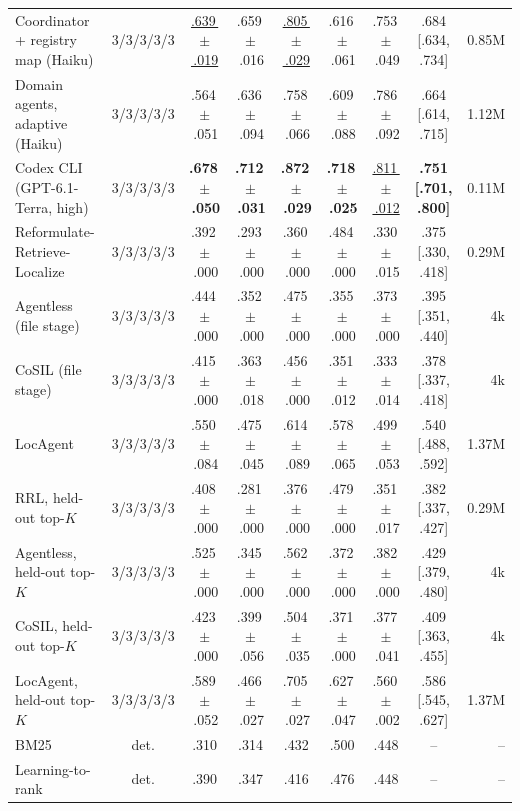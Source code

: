 \begin{table}[t]
{\begin{tabular}{lcccccccr}
Coordinator + registry map (Haiku) & 3/3/3/3/3 & \underline{.639\,$\pm$\,.019} & .659\,$\pm$\,.016 & \underline{.805\,$\pm$\,.029} & .616\,$\pm$\,.061 & .753\,$\pm$\,.049 & .684 [.634, .734] & 0.85M \\
Domain agents, adaptive (Haiku) & 3/3/3/3/3 & .564\,$\pm$\,.051 & .636\,$\pm$\,.094 & .758\,$\pm$\,.066 & .609\,$\pm$\,.088 & .786\,$\pm$\,.092 & .664 [.614, .715] & 1.12M \\
\midrule
Codex CLI (GPT-6.1-Terra, high) & 3/3/3/3/3 & \textbf{.678\,$\pm$\,.050} & \textbf{.712\,$\pm$\,.031} & \textbf{.872\,$\pm$\,.029} & \textbf{.718\,$\pm$\,.025} & \underline{.811\,$\pm$\,.012} & \textbf{.751 [.701, .800]} & 0.11M \\
\midrule
Reformulate-Retrieve-Localize & 3/3/3/3/3 & .392\,$\pm$\,.000 & .293\,$\pm$\,.000 & .360\,$\pm$\,.000 & .484\,$\pm$\,.000 & .330\,$\pm$\,.015 & .375 [.330, .418] & 0.29M \\
Agentless (file stage) & 3/3/3/3/3 & .444\,$\pm$\,.000 & .352\,$\pm$\,.000 & .475\,$\pm$\,.000 & .355\,$\pm$\,.000 & .373\,$\pm$\,.000 & .395 [.351, .440] & 4k \\
CoSIL (file stage) & 3/3/3/3/3 & .415\,$\pm$\,.000 & .363\,$\pm$\,.018 & .456\,$\pm$\,.000 & .351\,$\pm$\,.012 & .333\,$\pm$\,.014 & .378 [.337, .418] & 4k \\
LocAgent & 3/3/3/3/3 & .550\,$\pm$\,.084 & .475\,$\pm$\,.045 & .614\,$\pm$\,.089 & .578\,$\pm$\,.065 & .499\,$\pm$\,.053 & .540 [.488, .592] & 1.37M \\
\midrule
RRL, held-out top-$K$ & 3/3/3/3/3 & .408\,$\pm$\,.000 & .281\,$\pm$\,.000 & .376\,$\pm$\,.000 & .479\,$\pm$\,.000 & .351\,$\pm$\,.017 & .382 [.337, .427] & 0.29M \\
Agentless, held-out top-$K$ & 3/3/3/3/3 & .525\,$\pm$\,.000 & .345\,$\pm$\,.000 & .562\,$\pm$\,.000 & .372\,$\pm$\,.000 & .382\,$\pm$\,.000 & .429 [.379, .480] & 4k \\
CoSIL, held-out top-$K$ & 3/3/3/3/3 & .423\,$\pm$\,.000 & .399\,$\pm$\,.056 & .504\,$\pm$\,.035 & .371\,$\pm$\,.000 & .377\,$\pm$\,.041 & .409 [.363, .455] & 4k \\
LocAgent, held-out top-$K$ & 3/3/3/3/3 & .589\,$\pm$\,.052 & .466\,$\pm$\,.027 & .705\,$\pm$\,.027 & .627\,$\pm$\,.047 & .560\,$\pm$\,.002 & .586 [.545, .627] & 1.37M \\
\midrule
BM25 & det. & .310 & .314 & .432 & .500 & .448 & -- & -- \\
Learning-to-rank & det. & .390 & .347 & .416 & .476 & .448 & -- & -- \\
\bottomrule
\end{tabular}}
\end{table}
